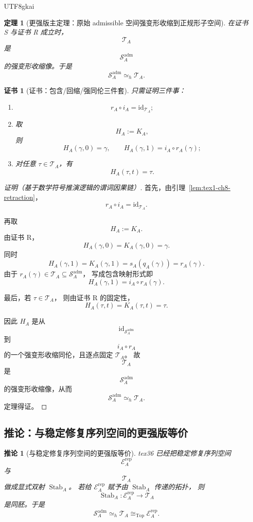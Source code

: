 \documentclass[12pt]{article}
\newtheorem{theorem}{定理}[section]
\newtheorem{corollary}{推论}[section]
\newtheorem{Certificate}{证书}[section]
\newcommand{\id}{\mathrm{id}}
\begin{document}
\begin{CJK*}{UTF8}{gkai}
\begin{theorem}[更强版主定理：原始 admissible 空间强变形收缩到正规形子空间]
\label{thm:tex1-ch8-strong}
在证书 S 与证书 R 成立时，
\[
  \mathcal T_A
\]
是
\[
  \mathcal S_A^{\mathrm{adm}}
\]
的强变形收缩像。于是
\[
  \boxed{
    \mathcal S_A^{\mathrm{adm}}
    \simeq_h
    \mathcal T_A.
  }
\]
\end{theorem}

\begin{Certificate}[证书：包含/回缩/强同伦三件套]
\label{cert:tex1-ch8-strong}
只需证明三件事：
\begin{enumerate}
  \item
  \[
    r_A\circ i_A=\id_{\mathcal T_A};
  \]
  \item 取
  \[
    H_A:=K_A,
  \]
  则
  \[
    H_A(\gamma,0)=\gamma,
    \qquad
    H_A(\gamma,1)=i_A\circ r_A(\gamma);
  \]
  \item 对任意 \(\tau\in\mathcal T_A\)，有
  \[
    H_A(\tau,t)=\tau.
  \]
\end{enumerate}
\end{Certificate}

\begin{proof}[证明（基于数学符号推演逻辑的谓词因果链）]
首先，由引理~\ref{lem:tex1-ch8-retraction}，
\[
  r_A\circ i_A=\id_{\mathcal T_A}.
\]

再取
\[
  H_A:=K_A.
\]
由证书 R，
\[
  H_A(\gamma,0)=K_A(\gamma,0)=\gamma.
\]
同时
\[
  H_A(\gamma,1)
  =
  K_A(\gamma,1)
  =
  s_A(q_A(\gamma))
  =
  r_A(\gamma).
\]
由于 \(r_A(\gamma)\in \mathcal T_A\subseteq \mathcal S_A^{\mathrm{adm}}\)，
写成包含映射形式即
\[
  H_A(\gamma,1)=i_A\circ r_A(\gamma).
\]

最后，若 \(\tau\in \mathcal T_A\)，
则由证书 R 的固定性，
\[
  H_A(\tau,t)=K_A(\tau,t)=\tau.
\]

因此 \(H_A\) 是从
\[
  \id_{\mathcal S_A^{\mathrm{adm}}}
\]
到
\[
  i_A\circ r_A
\]
的一个强变形收缩同伦，且逐点固定 \(\mathcal T_A\)。
故
\[
  \mathcal T_A
\]
是
\[
  \mathcal S_A^{\mathrm{adm}}
\]
的强变形收缩像，从而
\[
  \mathcal S_A^{\mathrm{adm}} \simeq_h \mathcal T_A.
\]
定理得证。
\end{proof}

\subsection{推论：与稳定修复序列空间的更强版等价}
\label{subsec:tex1-ch8-corollaries}

\begin{corollary}[与稳定修复序列空间的更强版等价]
\label{cor:tex1-ch8-rep}
tex36 已经把稳定修复序列空间
\[
  \mathcal E_A^{\mathrm{rep}}
\]
与
\[
  \mathcal T_A
\]
做成显式双射 \(\operatorname{Stab}_A\)。
若给 \(\mathcal E_A^{\mathrm{rep}}\) 赋予由 \(\operatorname{Stab}_A\) 传递的拓扑，
则
\[
  \operatorname{Stab}_A:\mathcal E_A^{\mathrm{rep}}\to \mathcal T_A
\]
是同胚。于是
\[
  \boxed{
    \mathcal S_A^{\mathrm{adm}}
    \simeq_h
    \mathcal T_A
    \cong_{\mathrm{Top}}
    \mathcal E_A^{\mathrm{rep}}.
  }
\]
\end{corollary}


\end{CJK*}
\end{document}
